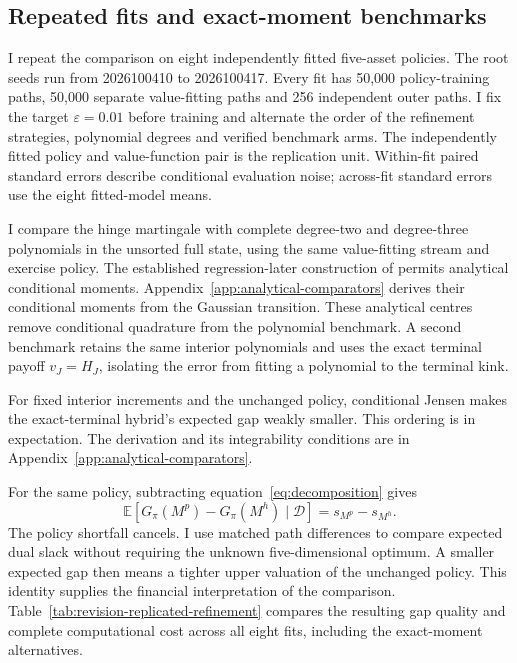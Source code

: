 \documentclass[11pt]{article}
\newcommand{\E}{\mathbb E}
\begin{document}
\subsection{Repeated fits and exact-moment benchmarks}

I repeat the comparison on eight independently fitted five-asset policies. The root seeds run from 2026100410 to 2026100417. Every fit has 50,000 policy-training paths, 50,000 separate value-fitting paths and 256 independent outer paths. I fix the target $\varepsilon=0.01$ before training and alternate the order of the refinement strategies, polynomial degrees and verified benchmark arms. The independently fitted policy and value-function pair is the replication unit. Within-fit paired standard errors describe conditional evaluation noise; across-fit standard errors use the eight fitted-model means.

I compare the hinge martingale with complete degree-two and degree-three polynomials in the unsorted full state, using the same value-fitting stream and exercise policy. The established regression-later construction of \citet{glasserman2004later} permits analytical conditional moments. Appendix~\ref{app:analytical-comparators} derives their conditional moments from the Gaussian transition. These analytical centres remove conditional quadrature from the polynomial benchmark. A second benchmark retains the same interior polynomials and uses the exact terminal payoff $v_J=H_J$, isolating the error from fitting a polynomial to the terminal kink.

For fixed interior increments and the unchanged policy, conditional Jensen makes the exact-terminal hybrid's expected gap weakly smaller. This ordering is in expectation. The derivation and its integrability conditions are in Appendix~\ref{app:analytical-comparators}.

For the same policy, subtracting equation~\eqref{eq:decomposition} gives
\begin{equation}
 \E[G_\pi(M^{p})-G_\pi(M^{h})\mid\mathcal D]
 =s_{M^{p}}-s_{M^{h}}.
\label{eq:pairedslack}
\end{equation}
The policy shortfall cancels. I use matched path differences to compare expected dual slack without requiring the unknown five-dimensional optimum. A smaller expected gap then means a tighter upper valuation of the unchanged policy. This identity supplies the financial interpretation of the comparison. Table~\ref{tab:revision-replicated-refinement} compares the resulting gap quality and complete computational cost across all eight fits, including the exact-moment alternatives.
\end{document}
